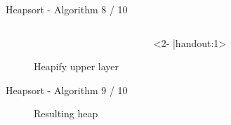 
\begin{frame}{Heapsort - Algorithm 8 / 10}
  \begin{centering}
   \begin{figure}[!h]%
     \begin{columns}%
       \begin{column}{0.425\textwidth}%
         \begin{adjustbox}{width=\linewidth}%
         \end{adjustbox}%
       \end{column}%
       \begin{column}{0.425\textwidth}<2- |handout:1>%
          \begin{adjustbox}{width=\linewidth}%
          \end{adjustbox}%
        \end{column}%
      \end{columns}%
      \caption{Heapify upper layer}%
      \label{fig:heapify_upper}%
    \end{figure}
  \end{centering}
\end{frame}


\begin{frame}{Heapsort - Algorithm 9 / 10}
  \begin{centering}
    \begin{figure}[!h]
      \begin{adjustbox}{width=0.425\linewidth}%
      \end{adjustbox}%
      \caption{Resulting heap}%
      \label{fig:heapify_upper_final}%
    \end{figure}
  \end{centering}
\end{frame}


